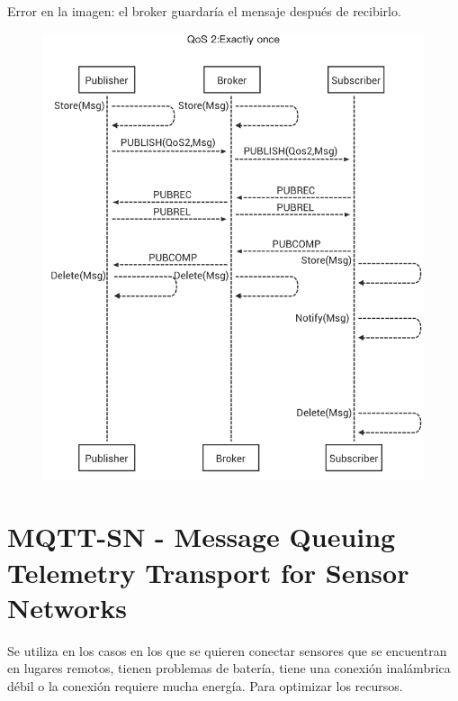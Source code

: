 \documentclass[12pt]{report} %
\begin{document}
\begin{description}
	Error en la imagen: el broker guardaría el mensaje después de recibirlo.
	\begin{figure}[H]
		{\includegraphics[scale=.35]{0_G6zwc_VftJ4AcueS.png}}
	\end{figure}
\end{description}

\section{MQTT-SN - Message Queuing Telemetry Transport for Sensor Networks}
Se utiliza en los casos en los que se quieren conectar sensores que se encuentran en lugares remotos, tienen problemas de batería, tiene una conexión inalámbrica débil o la conexión requiere mucha energía. Para optimizar los recursos.
\end{document}
